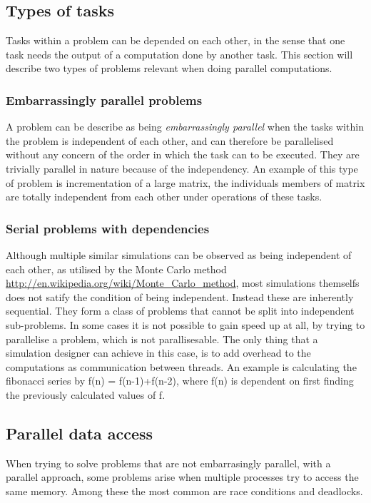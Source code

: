 \subsection{Types of tasks}\label{top}

Tasks within a problem can be depended on each other, in the sense that one task needs the output of a computation done by another task. This section will describe two types of problems relevant when doing parallel computations.

\subsubsection{Embarrassingly parallel problems}
A problem can be describe as being \emph{embarrassingly parallel} when the tasks within the problem is independent of each other, and can therefore be parallelised without any concern of the order in which the task can to be executed. They are trivially parallel in nature because of the independency. An example of this type of problem is incrementation of a large matrix, the individuals members of matrix are totally independent from each other under operations of these tasks.

\subsubsection{Serial problems with dependencies}
Although multiple similar simulations can be observed as being independent of each other, as utilised by the Monte Carlo method \url{http://en.wikipedia.org/wiki/Monte_Carlo_method}, most simulations themselfs does not satify the condition of being independent. Instead these are inherently sequential. They form a class of problems that cannot be split into independent sub-problems. In some cases it is not possible to gain speed up at all, by trying to parallelise a problem, which is not parallisesable. The only thing that a simulation designer can achieve in this case, is to add overhead to the computations as communication between threads. An example is calculating the fibonacci series by f(n) = f(n-1)+f(n-2), where f(n) is dependent on first finding the previously calculated values of f.

\subsection{Parallel data access}
When trying to solve problems that are not embarrasingly parallel, with a parallel approach, some problems arise when multiple processes try to access the same memory. Among these the most common are race conditions and deadlocks.

